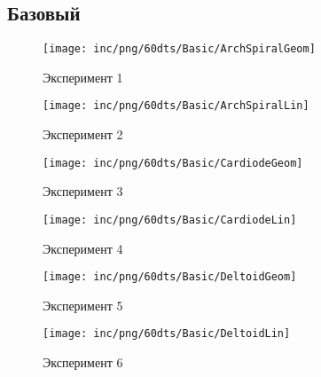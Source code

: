\subsection{Базовый}
\begin{figure}  
	\begin{minipage}{0,5\textwidth}
		\texttt{[image: inc/png/60dts/Basic/ArchSpiralGeom]}
		\label{fig:app1}
		\caption{Эксперимент 1}
	\end{minipage}
	\begin{minipage}{0,5\textwidth}
		\texttt{[image: inc/png/60dts/Basic/ArchSpiralLin]}
		\label{fig:app2}
		\caption{Эксперимент 2}
	\end{minipage}
	
	\begin{minipage}{0,5\textwidth}
		\texttt{[image: inc/png/60dts/Basic/CardiodeGeom]}
		\label{fig:app3}
		\caption{Эксперимент 3}
	\end{minipage}
	\begin{minipage}{0,5\textwidth}
		\texttt{[image: inc/png/60dts/Basic/CardiodeLin]}
		\label{fig:app4}
		\caption{Эксперимент 4}
	\end{minipage}
	
	\begin{minipage}{0,5\textwidth}
		\texttt{[image: inc/png/60dts/Basic/DeltoidGeom]}
		\label{fig:app1}
		\caption{Эксперимент 5}
	\end{minipage}
	\begin{minipage}{0,5\textwidth}
		\texttt{[image: inc/png/60dts/Basic/DeltoidLin]}
		\label{fig:app2}
		\caption{Эксперимент 6}
	\end{minipage}
\end{figure}


